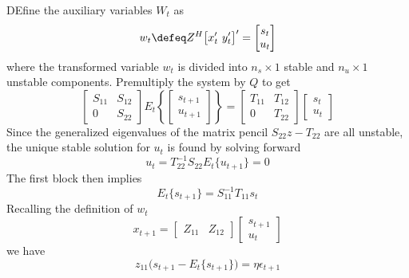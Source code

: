 \documentclass[a4paper,10pt]{article}  %
\begin{document}
DEfine the auxiliary variables $ W_t $ as
\begin{equation}
   \label{eq:aux}
   w_t \defeq Z^{H} \big[ x_t' \ y_t' \big]' =
   \begin{bmatrix}
      s_t \\ u_t
   \end{bmatrix}
\end{equation}
where the transformed variable $ w_t $ is divided into $ n_s\times 1 $ stable and $ n_u \times 1 $ unstable components. 
Premultiply the system by $ Q $ to get 
\begin{equation}
   \begin{bmatrix}
      S_{11} & S_{12} \\ 0 & S_{22}
   \end{bmatrix}
   E_t \left\{
   \begin{bmatrix}
      s_{t+1} \\ u_{t+1}
   \end{bmatrix} \right\}
    = 
    \begin{bmatrix}
       T_{11} & T_{12} \\ 0 & T_{22}
    \end{bmatrix}
    \begin{bmatrix}
      s_{t} \\ u_{t}
   \end{bmatrix}
\end{equation}
Since the generalized eigenvalues of the matrix pencil $ S_{22}z - T_{22} $ are all unstable, the unique stable solution
for $ u_t $ is found by solving forward
\begin{equation}
   \label{eq:unstable_sol}
   u_t = T_{22}^{-1} S_{22} E_t\{ u_{t+1} \} = 0
\end{equation}
The first block then implies
\begin{equation}
   E_t\big\{ s_{t+1} \big\}  = S_{11}^{-1} T_{11} s_t
\end{equation}
Recalling the definition of $ w_t $
\begin{equation}
   x_{t+1} = 
      \begin{bmatrix}
         Z_{11} & Z_{12}
      \end{bmatrix} 
      \begin{bmatrix}
         s_{t+1} \\ u_{t}
      \end{bmatrix}
\end{equation}
we have
\begin{equation}
   \label{eq:}
   z_{11} \Big( s_{t+1} -  E_t\{ s_{t+1} \}\Big) = \eta \epsilon_{t+1}
\end{equation}
\end{document}
